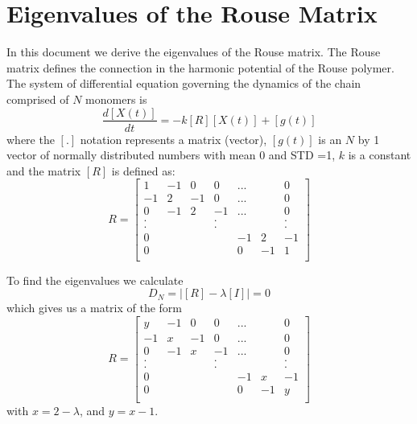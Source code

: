 \documentclass[12pt]{report}
\begin{document}
\section{Eigenvalues of the Rouse Matrix}\label{section_eigenvaluesOfTheRouseMatrix}
In this document we derive the eigenvalues of the Rouse matrix. The Rouse matrix defines the connection in the harmonic potential of the Rouse polymer. The system of differential equation governing the dynamics of the chain comprised of $N$ monomers is 
\begin{equation}
\frac{d[X(t)]}{dt}=-k[R][X(t)]+[g(t)]
\end{equation}
where the $[.]$ notation represents a matrix (vector), $[g(t)]$ is an $N$ by 1 vector of normally distributed numbers with mean 0 and STD =1, $k$ is a constant and the matrix $[R]$ is defined as:
\begin{equation}
R=\left[
\begin{matrix}
 1 & -1 &  0 &  0 &...&  &  0 \\
-1 &  2 & -1 &  0 &...&  &  0 \\
 0 & -1 &  2 & -1 &...&  &  0 \\
 . &    &    &  . &   &  &  . \\
 . &    &    &  . &   &  &  . \\
 0 &    &    &    & -1& 2& -1 \\
 0 &    &    &    &  0&-1&  1 \\     
\end{matrix}
\right]
\end{equation}

To find the eigenvalues we calculate 
\begin{equation*}
D_N=\left|[R]-\lambda[I]\right|=0
\end{equation*}
which gives us a matrix of the form 
\begin{equation*}
R=\left[
\begin{matrix}
 y & -1 &  0 &  0 &...&  &  0 \\
-1 &  x & -1 &  0 &...&  &  0 \\
 0 & -1 &  x & -1 &...&  &  0 \\
 . &    &    &  . &   &  &  . \\
 . &    &    &  . &   &  &  . \\
 0 &    &    &    & -1& x& -1 \\
 0 &    &    &    &  0&-1&  y \\     
\end{matrix}
\right]
\end{equation*}
with $x=2-\lambda$, and $y=x-1$.
\end{document}
